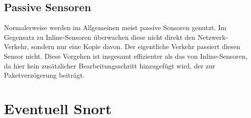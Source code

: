 \subsection{Passive Sensoren}
Normalerweise werden im Allgemeinen meist passive Sensoren genutzt. Im Gegensatz zu Inline-Sensoren überwachen diese nicht direkt den Netzwerk-Verkehr, sondern nur eine Kopie davon. Der eigentliche Verkehr passiert diesen Sensor nicht. Diese Vorgehen ist insgesamt effizienter als das von Inline-Sensoren, da hier kein zusätzlicher Bearbeitungsschritt hinzugefügt wird, der zur Paketverzögerung beiträgt.\cite{url_sensors}

\section{Eventuell Snort}